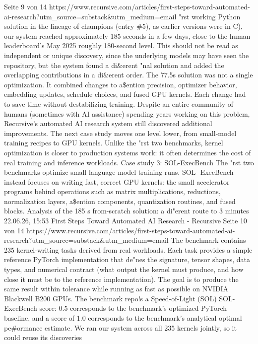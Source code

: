 Seite 9 von 14
https://www.recursive.com/articles/first-steps-toward-automated-ai-research?utm\_source=substack\&utm\_medium=email
"rst working Python solution in the lineage of champions (entry \#5), as earlier
versions were in C), our system reached approximately 185 seconds in a few
days, close to the human leaderboard’s May 2025 roughly 180-second level. This
should not be read as independent or unique discovery, since the underlying
models may have seen the repository, but the system found a di\&erent
"nal solution and added the overlapping contributions in a di\&erent order.
The 77.5s solution was not a single optimization. It combined changes to
a\$ention precision, optimizer behavior, embedding updates, schedule
choices, and fused GPU kernels. Each change had to save time without
destabilizing training.
Despite an entire community of humans (sometimes with AI assistance)
spending years working on this problem, Recursive’s automated AI research
system still discovered additional improvements. The next case study moves
one level lower, from small-model training recipes to GPU kernels. Unlike the
"rst two benchmarks, kernel optimization is closer to production systems
work: it often determines the cost of real training and inference workloads.
Case study 3: SOL-ExecBench
The "rst two benchmarks optimize small language model training runs. SOL-
ExecBench instead focuses on writing fast, correct GPU kernels: the small
accelerator programs behind operations such as matrix multiplications,
reductions, normalization layers, a\$ention components, quantization routines,
and fused blocks.
Analysis of the 185 s from-scratch
solution: a di"erent route to 3 minutes
22.06.26, 15:53
First Steps Toward Automated AI Research - Recursive
Seite 10 von 14
https://www.recursive.com/articles/first-steps-toward-automated-ai-research?utm\_source=substack\&utm\_medium=email
The benchmark contains 235 kernel-writing tasks derived from real workloads.
Each task provides a simple reference PyTorch implementation that de"nes
the signature, tensor shapes, data types, and numerical contract (what
output the kernel must produce, and how close it must be to the reference
implementation). The goal is to produce the same result within tolerance
while running as fast as possible on NVIDIA Blackwell B200 GPUs.
The benchmark repo!s a Speed-of-Light (SOL) SOL-ExecBench score: 0.5
corresponds to the benchmark’s optimized PyTorch baseline, and a score of
1.0 corresponds to the benchmark’s analytical optimal pe\#ormance estimate.
We ran our system across all 235 kernels jointly, so it could reuse its discoveries

